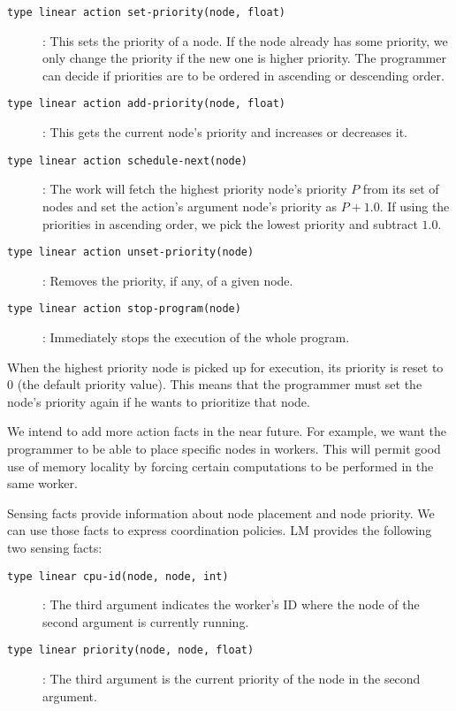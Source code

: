 \begin{description}
   \item[\texttt{type linear action set-priority(node, float)}]: This sets the priority of a node. If the node already has some priority, we only change the priority if the new one is higher priority. The programmer can decide if priorities are to be ordered in ascending or descending order.
   \item[\texttt{type linear action add-priority(node, float)}]: This gets the current node's priority and increases or decreases it.
   \item[\texttt{type linear action schedule-next(node)}]: The work will fetch the highest priority node's priority $P$ from its set of nodes and set the action's argument node's priority as $P + 1.0$. If using the priorities
   in ascending order, we pick the lowest priority and subtract $1.0$.
   \item[\texttt{type linear action unset-priority(node)}]: Removes the priority, if any, of a given node.
   \item[\texttt{type linear action stop-program(node)}]: Immediately stops the execution of the whole program.
\end{description}

When the highest priority node is picked up for execution, its priority is reset to 0 (the default priority value). This means that
the programmer must set the node's priority again if he wants to prioritize that node.

We intend to add more action facts in the near future. For example, we want the programmer to be able to place specific nodes in workers. This will permit good use of
memory locality by forcing certain computations to be performed in the same worker.

Sensing facts provide information about node placement and node priority. We can use those facts
to express coordination policies. LM provides the following two
sensing facts:

\begin{description}
   \item[\texttt{type linear cpu-id(node, node, int)}]: The third argument indicates the worker's ID where the node of the second argument is currently running.
   \item[\texttt{type linear priority(node, node, float)}]: The third argument is the current priority of the node in the second argument.
\end{description}

